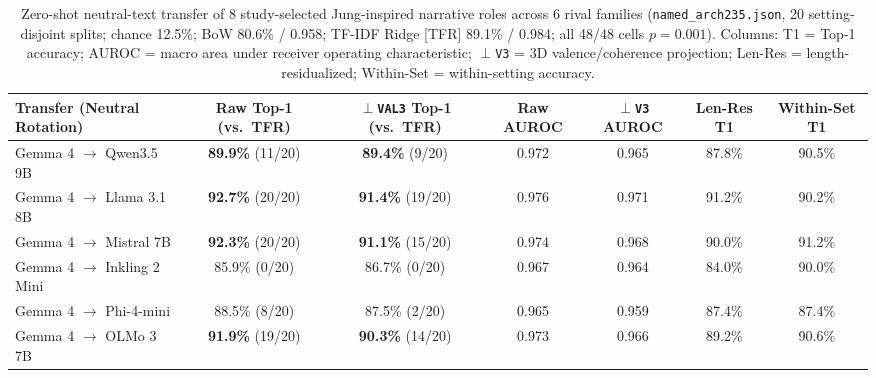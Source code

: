 \documentclass[conference]{IEEEtran}
\begin{document}
\begin{table}[t]
\centering
\caption{Zero-shot neutral-text transfer of 8 study-selected Jung-inspired narrative roles across 6 rival families (\texttt{named\_arch235.json}, 20 setting-disjoint splits; chance 12.5\%; BoW 80.6\% / 0.958; TF-IDF Ridge [TFR] 89.1\% / 0.984; all 48/48 cells $p=0.001$). Columns: T1 = Top-1 accuracy; AUROC = macro area under receiver operating characteristic; $\perp$\texttt{V3} = 3D valence/coherence projection; Len-Res = length-residualized; Within-Set = within-setting accuracy.}
\label{tab:named}
\scriptsize
\setlength{\tabcolsep}{3.5pt}
\begin{tabular}{@{}lcccccc@{}}
\toprule
\textbf{Transfer (Neutral Rotation)} & \textbf{Raw Top-1 (vs.\ TFR)} & \textbf{$\perp$\texttt{VAL3} Top-1 (vs.\ TFR)} & \textbf{Raw AUROC} & \textbf{$\perp$\texttt{V3} AUROC} & \textbf{Len-Res T1} & \textbf{Within-Set T1} \\
\midrule
Gemma 4 $\to$ Qwen3.5 9B & \textbf{89.9\%} (11/20) & \textbf{89.4\%} (9/20) & 0.972 & 0.965 & 87.8\% & 90.5\% \\
Gemma 4 $\to$ Llama 3.1 8B & \textbf{92.7\%} (20/20) & \textbf{91.4\%} (19/20) & 0.976 & 0.971 & 91.2\% & 90.2\% \\
Gemma 4 $\to$ Mistral 7B & \textbf{92.3\%} (20/20) & \textbf{91.1\%} (15/20) & 0.974 & 0.968 & 90.0\% & 91.2\% \\
Gemma 4 $\to$ Inkling 2 Mini & 85.9\% (0/20) & 86.7\% (0/20) & 0.967 & 0.964 & 84.0\% & 90.0\% \\
Gemma 4 $\to$ Phi-4-mini & 88.5\% (8/20) & 87.5\% (2/20) & 0.965 & 0.959 & 87.4\% & 87.4\% \\
Gemma 4 $\to$ OLMo 3 7B & \textbf{91.9\%} (19/20) & \textbf{90.3\%} (14/20) & 0.973 & 0.966 & 89.2\% & 90.6\% \\
\bottomrule
\end{tabular}
\end{table}
\end{document}
